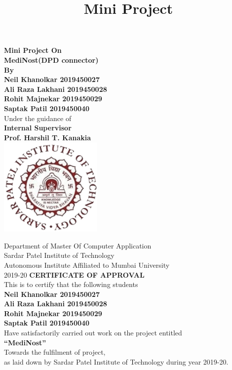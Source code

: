 \documentclass{article}
\title{Mini Project}
\author{}
\begin{document}
\thispagestyle{empty}
\begin{center}
\textbf{\LARGE Mini Project On \\
\bigskip
MediNost(DPD connector)\\
\bigskip
By\\
\bigskip
Neil Khanolkar 2019450027\\ 
Ali Raza Lakhani 2019450028 \\
Rohit Majnekar 2019450029 \\ 
Saptak Patil 2019450040 \\
}
\bigskip
Under the guidance of\\
\textbf{
\bigskip
\Large Internal Supervisor\\
\LARGE Prof. Harshil T. Kanakia\\ 
}
\bigskip
\bigskip
\includegraphics[width=5cm]{SPIT-Logo.png}
 \bigskip
 \bigskip
 
\Large Department of Master Of Computer Application\\
Sardar Patel Institute of Technology\\
Autonomous Institute Affiliated to Mumbai University\\

2019-20
\clearpage
\thispagestyle{empty}
\textbf{\Large CERTIFICATE OF APPROVAL\\}
\bigskip
\bigskip
This is to certify that the following students\\
\bigskip
\bigskip
\textbf{
Neil Khanolkar 2019450027\\ 
Ali Raza Lakhani 2019450028 \\
Rohit Majnekar 2019450029 \\ 
Saptak Patil 2019450040 \\
}
\bigskip \bigskip
Have satisfactorily carried out work on the project entitled\\
\bigskip \bigskip
\textbf{
\LARGE “MediNost”\\
}
\bigskip \bigskip
Towards the fulfilment of project,\\

as laid down by Sardar Patel Institute of Technology during year 2019-20.

\end{center}
\end{document}
